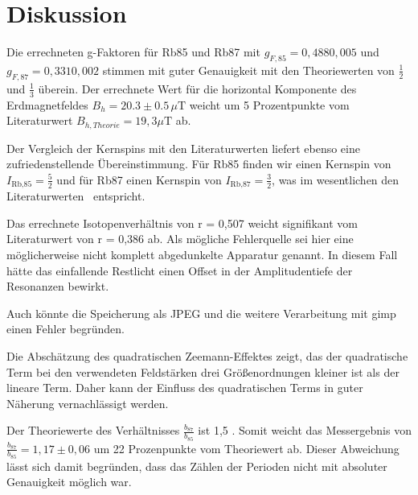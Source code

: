 \section{Diskussion}
Die errechneten g-Faktoren für Rb85 und Rb87 mit $g_{F,85} = 0,488 $\pm$ 0,005$ und
$g_{F,87} = 0,331 $\pm$ 0,002$ stimmen mit guter Genauigkeit mit den Theoriewerten von $\frac{1}{2}$ und $\frac{1}{3}$ überein.
Der errechnete Wert für die horizontal Komponente des Erdmagnetfeldes $B_{h} = 20.3\pm0.5\,\mu\text{T}$ weicht um 5 Prozentpunkte vom
Literaturwert $B_{h,Theorie} = 19,3\mu\text{T}$ \cite{hB} ab.

Der Vergleich der Kernspins mit den Literaturwerten liefert ebenso eine zufriedenstellende Übereinstimmung.
Für Rb85 finden wir einen Kernspin von  $I_\text{Rb,85} = \frac{5}{2}$ und für Rb87 einen Kernspin von $I_\text{Rb,87} = \frac{3}{2}$, was im wesentlichen den Literaturwerten \cite{coreSpin} entspricht.

Das errechnete Isotopenverhältnis von r = 0,507 weicht signifikant vom Literaturwert von r = 0,386 \cite{isoVer} ab. Als mögliche Fehlerquelle sei hier eine möglicherweise nicht komplett abgedunkelte Apparatur genannt. In diesem Fall hätte das einfallende Restlicht
einen Offset in der Amplitudentiefe der Resonanzen bewirkt.

Auch könnte die Speicherung als JPEG und die weitere Verarbeitung mit gimp einen Fehler begründen.

Die Abschätzung des quadratischen Zeemann-Effektes zeigt, das der quadratische Term bei den verwendeten Feldstärken drei Größenordnungen kleiner ist als der lineare Term. Daher kann der Einfluss des quadratischen Terms in guter Näherung vernachlässigt werden.

Der Theoriewerte des Verhältnisses $\frac{b_{87}}{b_{85}}$ ist 1,5 \cite{FP}. Somit weicht das Messergebnis von $\frac{b_{87}}{b_{85}} = 1,17 \pm 0,06$ um 22 Prozenpunkte vom Theoriewert ab.
Dieser Abweichung lässt sich damit begründen, dass das Zählen der Perioden nicht mit absoluter Genauigkeit möglich war.

\printbibliography
